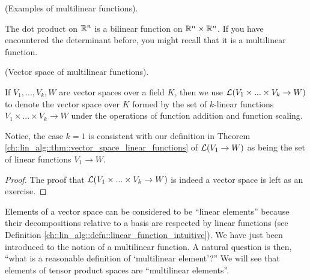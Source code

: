 \begin{example}
    (Examples of multilinear functions). 
    
    The dot product on $\mathbb{R}^n$ is a bilinear function on $\mathbb{R}^n \times \mathbb{R}^n$. If you have encountered the determinant before, you might recall that it is a multilinear function.
\end{example}

\begin{defn}
    (Vector space of multilinear functions).
    
    If $V_1, ..., V_k, W$ are vector spaces over a field $K$, then we use $\mathcal{L}(V_1 \times ... \times V_k \rightarrow W)$ to denote the vector space over $K$ formed by the set of $k$-linear functions $V_1 \times ... \times V_k \rightarrow W$ under the operations of function addition and function scaling.
    
    Notice, the case $k = 1$ is consistent with our definition in Theorem \ref{ch::lin_alg::thm::vector_space_linear_functions} of $\mathcal{L}(V_1 \rightarrow W)$ as being the set of linear functions $V_1 \rightarrow W$.
\end{defn}

\begin{proof}
     The proof that $\mathcal{L}(V_1 \times ... \times V_k \rightarrow W)$ is indeed a vector space is left as an exercise.
\end{proof}

Elements of a vector space can be considered to be ``linear elements'' because their decompositions relative to a basis are respected by linear functions (see Definition \ref{ch::lin_alg::defn::linear_function_intuitive}). We have just been introduced to the notion of a multilinear function. A natural question is then, ``what is a reasonable definition of `multilinear element'?'' We will see that elements of tensor product spaces are  ``multilinear elements''.

\newpage

